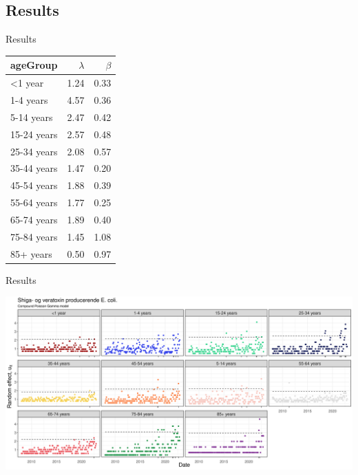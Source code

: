 \documentclass[aspectratio=169]{beamer}
\begin{document}
\hypertarget{results-2}{%
\subsection{Results}\label{results-2}}

\begin{frame}{Results}
\tiny

\begin{table}
\centering\begingroup\fontsize{10}{12}\selectfont

\begin{tabular}{lrr}
\toprule
ageGroup & $\lambda$ & $\beta$\\
\midrule
<1 year & 1.24 & 0.33\\
1-4 years & 4.57 & 0.36\\
5-14 years & 2.47 & 0.42\\
15-24 years & 2.57 & 0.48\\
25-34 years & 2.08 & 0.57\\
35-44 years & 1.47 & 0.20\\
45-54 years & 1.88 & 0.39\\
55-64 years & 1.77 & 0.25\\
65-74 years & 1.89 & 0.40\\
75-84 years & 1.45 & 1.08\\
85+ years & 0.50 & 0.97\\
\bottomrule
\end{tabular}
\endgroup{}
\end{table}

\normalsize
\end{frame}

\begin{frame}{Results}
\protect\hypertarget{results-3}{}
\tiny

\includegraphics[width=1\linewidth]{../figures/PoisGxSTEC}

\normalsize
\end{frame}
\end{document}
